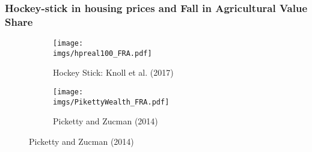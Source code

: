 \documentclass[aspectratio=169]{beamer}
\begin{document}



\begin{frame}
\frametitle{Hockey-stick in housing prices and Fall in Agricultural Value Share}

\begin{figure}
    \centering
    \begin{subfigure}[t]{0.49\textwidth}
        \centering
        \texttt{[image: \\imgs/hpreal100\_FRA.pdf]}
        \caption{Hockey Stick: Knoll et al. (2017)}
        \label{fig:sub1}
    \end{subfigure}\hskip 1mm%
    \begin{subfigure}[t]{0.49\textwidth}
        \centering
        \texttt{[image: \\imgs/PikettyWealth\_FRA.pdf]}
        \caption{Picketty and Zucman (2014)}
        \label{fig:sub2}
    \end{subfigure}
\end{figure}


\end{frame}
\end{document}
